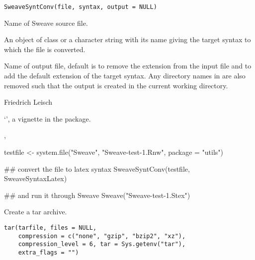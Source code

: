 %
\begin{Usage}
\begin{verbatim}
SweaveSyntConv(file, syntax, output = NULL)
\end{verbatim}
\end{Usage}
%
\begin{Arguments}
\begin{ldescription}
\item[\code{file}] Name of Sweave source file.
\item[\code{syntax}] An object of class  or a character
string with its name giving the target syntax to which the file is
converted.
\item[\code{output}] Name of output file, default is to remove the extension
from the input file and to add the default extension of the target
syntax. Any directory names in  are also removed such
that the output is created in the current working directory.
\end{ldescription}
\end{Arguments}
%
\begin{Author}\relax
Friedrich Leisch
\end{Author}
%
\begin{SeeAlso}\relax
`', a vignette in
the  package.

, 
\end{SeeAlso}
%
\begin{Examples}
\begin{ExampleCode}
testfile <- system.file("Sweave", "Sweave-test-1.Rnw", package = "utils")

## convert the file to latex syntax
SweaveSyntConv(testfile, SweaveSyntaxLatex)

## and run it through Sweave
Sweave("Sweave-test-1.Stex")


\end{ExampleCode}
\end{Examples}
%
\begin{Description}\relax
Create a tar archive.
\end{Description}
%
\begin{Usage}
\begin{verbatim}
tar(tarfile, files = NULL,
    compression = c("none", "gzip", "bzip2", "xz"),
    compression_level = 6, tar = Sys.getenv("tar"),
    extra_flags = "")
\end{verbatim}
\end{Usage}
